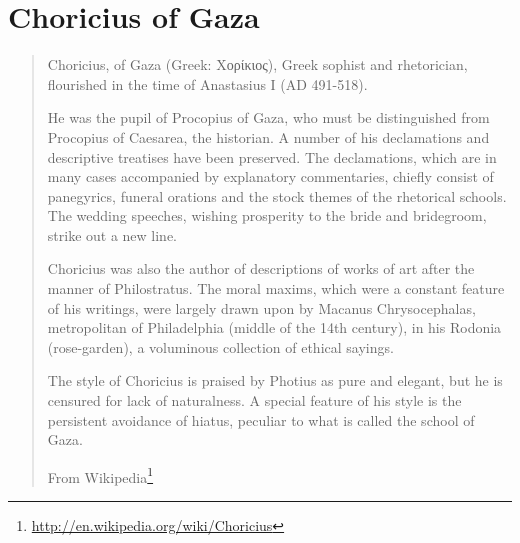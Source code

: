 \documentclass[12pt,letterpaper,twoside,final]{memoir}
\begin{document}
\section{Choricius of Gaza}
\blockquote[From Wikipedia\footnote{\url{http://en.wikipedia.org/wiki/Choricius}}]{Choricius, of Gaza (Greek: Χορίκιος), Greek sophist and rhetorician, flourished in the time of Anastasius I (AD 491-518).

He was the pupil of Procopius of Gaza, who must be distinguished from Procopius of Caesarea, the historian. A number of his declamations and descriptive treatises have been preserved. The declamations, which are in many cases accompanied by explanatory commentaries, chiefly consist of panegyrics, funeral orations and the stock themes of the rhetorical schools. The wedding speeches, wishing prosperity to the bride and bridegroom, strike out a new line.

Choricius was also the author of descriptions of works of art after the manner of Philostratus. The moral maxims, which were a constant feature of his writings, were largely drawn upon by Macanus Chrysocephalas, metropolitan of Philadelphia (middle of the 14th century), in his Rodonia (rose-garden), a voluminous collection of ethical sayings.

The style of Choricius is praised by Photius as pure and elegant, but he is censured for lack of naturalness. A special feature of his style is the persistent avoidance of hiatus, peculiar to what is called the school of Gaza.
}
\end{document}
